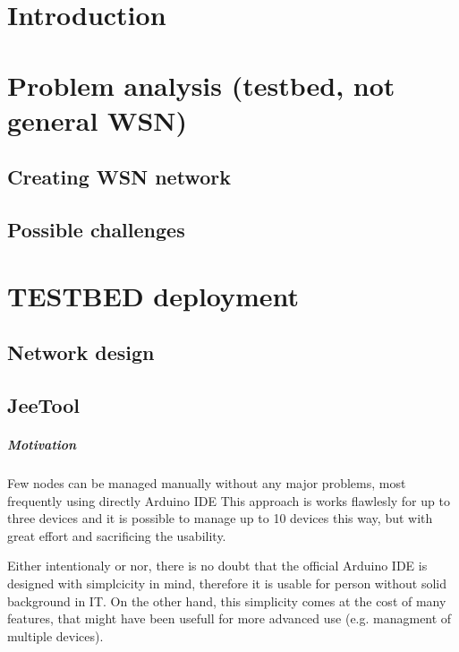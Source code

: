 \documentclass[
  digital, %
  table,   %
  nolof,     %
  nolot,     %
           oneside
]{fithesis3}
\begin{document}

\chapter{Introduction}
\chapter{ Problem analysis (testbed, not general WSN)}

  \section{Creating WSN network}
  \section{Possible challenges}
\chapter{TESTBED deployment}
  \section{Network design}
  \section{JeeTool} %
\paragraph{Motivation}
  Few nodes can be managed manually without any major problems, most frequently using directly Arduino IDE %
  This approach is works flawlesly for up to three devices and it is possible to manage up to 10 devices this way, but with great effort and sacrificing the usability.

  Either intentionaly or nor, there is no doubt that the official Arduino IDE is designed with simplcicity in mind, therefore it is usable for person without solid background in IT. %
  On the other hand, this simplicity comes at the cost of many features, that might have been usefull for more advanced use (e.g. managment of multiple devices).
\end{document}
